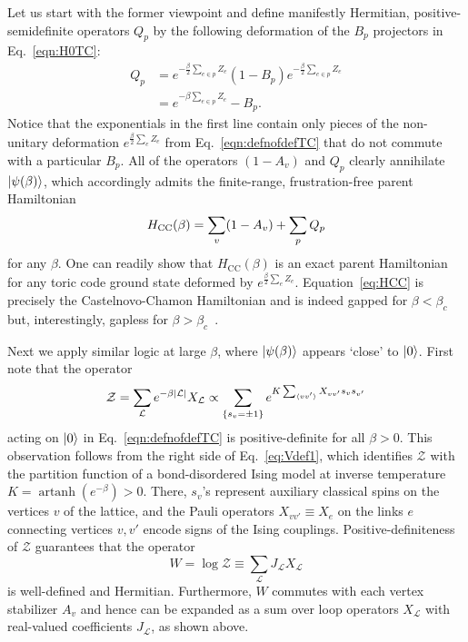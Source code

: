 \documentclass[aps,prl,twocolumn,floatfix,nofootinbib]{revtex4-2}
\theoremstyle{definition}
\DeclareMathOperator{\artanh}{artanh}
\newcommand{\cL}{\mathcal{L}}
\begin{document}
Let us start with the former viewpoint and define manifestly
Hermitian, positive-semidefinite operators $Q_p$ by the following deformation of the $B_p$ projectors in Eq.~\eqref{eqn:H0TC}:
\begin{equation}
    \begin{split}
        Q_p &= e^{-\frac{\beta}{2} \sum_{e \in p} Z_e} (1 - B_p) e^{- \frac{\beta}{2} \sum_{e \in p} Z_e} \\
            &= e^{-\beta \sum_{e \in p} Z_e} - B_p.
    \end{split}
\end{equation}
Notice that the exponentials in the first line contain only pieces of the non-unitary deformation $e^{ \frac{\beta}{2} \sum_e Z_e}$ from Eq.~\eqref{eqn:defnofdefTC} that do not commute with a particular $B_p$. All of the operators $(1-A_v)$ and $Q_p$ clearly annihilate $\ket{\psi(\beta)}$, which accordingly admits the finite-range, frustration-free parent Hamiltonian
\begin{equation}
    H_{\rm CC}(\beta) = \sum_v(1-A_v) + \sum_p Q_p
    \label{eq:HCC}
\end{equation}
for any $\beta$. One can readily show that $H_{\text{CC}}(\beta)$ is an exact parent Hamiltonian for any toric code ground state deformed by $e^{\frac{\beta}{2}\sum_e Z_e}$.  
Equation~\eqref{eq:HCC} is precisely the Castelnovo-Chamon Hamiltonian \cite{CastelnovoChamon2007DefToricCode} and is indeed gapped for $\beta<\beta_c$ but, interestingly, gapless for $\beta > \beta_c$~\cite{Sahay2025FunkyIsing}.

Next we apply similar logic at large $\beta$, where $\ket{\psi(\beta)}$ appears `close' to $\ket{0}$. First note that the operator 
\begin{equation}\label{eq:Vdef1}
\mathcal{Z} = \sum_{\cL} e^{-\beta \abs{\cL}} X_{\cL} \propto \sum_{\qty{s_v = \pm 1}} e^{ K \sum_{\expval*{v v'}} X_{vv'} s_v s_{v'}  }
\end{equation}
acting on $\ket{0}$ in Eq.~\eqref{eqn:defnofdefTC} is positive-definite for all $\beta > 0$. This observation follows from the right side of Eq.~\eqref{eq:Vdef1}, which identifies $\mathcal{Z}$ with the partition function of a bond-disordered Ising model at inverse temperature $K = \artanh(e^{-\beta}) >0$.  There, $s_v$'s represent auxiliary classical spins on the vertices $v$ of the lattice, and the Pauli operators $X_{v v'} \equiv X_e$ on the links $e$ connecting vertices $v,v'$ encode signs of the Ising couplings. Positive-definiteness of $\mathcal{Z}$ guarantees that the operator
\begin{equation}
    W = \log \mathcal{Z} \equiv \sum_{\cL} J_{\cL} X_{\cL}
    \label{eq:Vdef}
\end{equation}
is well-defined and Hermitian. Furthermore, $W$ commutes with each vertex stabilizer $A_v$ and hence can be expanded as a sum over loop operators $X_{\mathcal{L}}$ with real-valued coefficients $J_{\mathcal{L}}$, as shown above.
\end{document}
